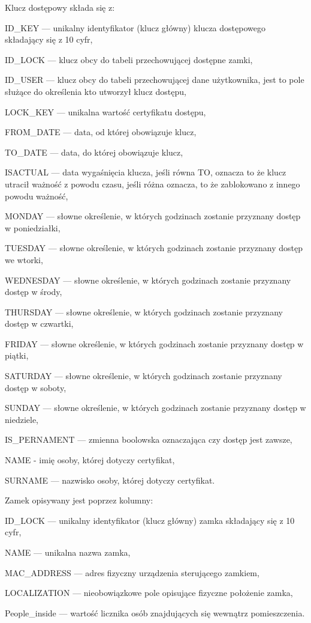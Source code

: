 \documentclass[twoside,10pt]{article}
\begin{document}
Klucz dostępowy składa się z:
\begin{itemize*}
\item {ID\_KEY} --- unikalny identyfikator (klucz główny) klucza dostępowego składający się z 10 cyfr,
\item {ID\_LOCK} --- klucz obcy do tabeli przechowującej dostępne zamki,
\item {ID\_USER} --- klucz obcy do tabeli przechowującej dane użytkownika, jest to pole służące do określenia kto utworzył klucz dostępu,
\item {LOCK\_KEY} --- unikalna wartość certyfikatu dostępu,
\item {FROM\_DATE} --- data, od której obowiązuje klucz,
\item {TO\_DATE} --- data, do której obowiązuje klucz,
\item {ISACTUAL} --- data wygaśnięcia klucza, jeśli równa TO, oznacza to że klucz utracił ważność z powodu czasu, jeśli różna oznacza, to że zablokowano z innego powodu ważność,
\item {MONDAY} --- słowne określenie, w których godzinach zostanie przyznany dostęp w poniedziałki,
\item {TUESDAY} --- słowne określenie, w których godzinach zostanie przyznany dostęp we wtorki,
\item {WEDNESDAY} --- słowne określenie, w których godzinach zostanie przyznany dostęp w środy,
\item {THURSDAY} --- słowne określenie, w których godzinach zostanie przyznany dostęp w czwartki,
\item {FRIDAY} --- słowne określenie, w których godzinach zostanie przyznany dostęp w piątki,
\item {SATURDAY} --- słowne określenie, w których godzinach zostanie przyznany dostęp w soboty,
\item {SUNDAY} --- słowne określenie, w których godzinach zostanie przyznany dostęp w niedziele,
\item {IS\_PERNAMENT} --- zmienna boolowska oznaczająca czy dostęp jest zawsze,
\item {NAME} - imię osoby, której dotyczy certyfikat,
\item {SURNAME} --- nazwisko osoby, której dotyczy certyfikat.
\end{itemize*}

\newpage
Zamek opisywany jest poprzez kolumny:
\begin{itemize*}
\item {ID\_LOCK} --- unikalny identyfikator (klucz główny) zamka składający się z 10 cyfr,
\item {NAME} --- unikalna nazwa zamka,
\item {MAC\_ADDRESS} --- adres fizyczny urządzenia sterującego zamkiem,
\item {LOCALIZATION} --- nieobowiązkowe pole opisujące fizyczne położenie zamka,
\item {People\_inside} --- wartość licznika osób znajdujących się wewnątrz pomieszczenia.
\end{itemize*}
\end{document}
